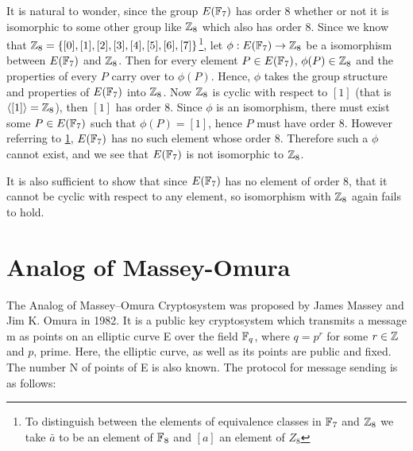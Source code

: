         \begin{figure}
            \centering
            
            \caption{}
            \label{fig:InverseAndOrder}
        \end{figure}

\hspace{10mm}It is natural to wonder, since the group $E(\mathbb{F}_7)$ has order $8$ whether or not it is isomorphic to some other group like $\mathbb{Z}_8$ which also has order $8$. Since we know that $\mathbb{Z}_8=\{[0],[1],[2],[3],[4],[5],[6],[7]\}$\footnote{To distinguish between the elements of equivalence classes in $\mathbb{F}_7$ and $\mathbb{Z}_8$ we take $\bar{a}$ to be an element of $\mathbb{F}_8$ and $[a]$ an element of $Z_8$}, let $\phi:E(\mathbb{F}_7) \rightarrow \mathbb{Z}_8$ be a isomorphism between $E(\mathbb{F}_7)$ and $\mathbb{Z}_8$. Then for every element $P \in E(\mathbb{F}_7)$, $\phi(P) \in  \mathbb{Z}_8$ and the properties of every $P$ carry over to $\phi(P)$. Hence, $\phi$ takes the group structure and properties of $E(\mathbb{F}_7)$ into $\mathbb{Z}_8$. Now $\mathbb{Z}_8$ is cyclic with respect to $[1]$ (that is $\langle[1]\rangle=\mathbb{Z}_8$), then $[1]$ has order 8. Since $\phi$ is an isomorphism, there must exist some $P \in E(\mathbb{F}_7)$ such that $\phi(P)=[1]$, hence $P$ must have order 8. However referring to \ref{fig:InverseAndOrder}, $E(\mathbb{F}_7)$ has no such element whose order 8. Therefore such a $\phi$ cannot exist, and we see that $E(\mathbb{F}_7)$ is not isomorphic to $\mathbb{Z}_8$.
    \begin{remark}
        It is also sufficient to show that since $E(\mathbb{F}_7)$ has no element of order 8, that it cannot be cyclic with respect to any element, so isomorphism with $\mathbb{Z}_8$ again fails to hold.
    \end{remark}
    

\section{Analog of Massey-Omura}

\hspace{10mm} The Analog of Massey–Omura Cryptosystem was proposed by James Massey and Jim K. Omura in 1982. It is a public key cryptosystem which transmits a message m as points on an elliptic curve E over the field $\mathbb{F}_q$,  where $q=p^r$ for some $r \in \mathbb{Z}$ and $p$, prime. Here, the elliptic curve, as well as its points are public and fixed. The number N of points of E is also known. The protocol for message sending is as follows:

